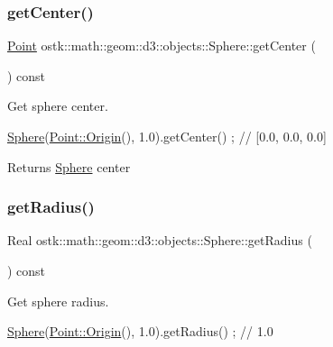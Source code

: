\subsubsection{\texorpdfstring{get\+Center()}{getCenter()}}
{\footnotesize\ttfamily \hyperlink{classostk_1_1math_1_1geom_1_1d3_1_1objects_1_1_point}{Point} ostk\+::math\+::geom\+::d3\+::objects\+::\+Sphere\+::get\+Center (\begin{DoxyParamCaption}{ }\end{DoxyParamCaption}) const}



Get sphere center. 


\begin{DoxyCode}
\hyperlink{classostk_1_1math_1_1geom_1_1d3_1_1objects_1_1_sphere_a6920f72260a7b2c9ffc29283540e16c2}{Sphere}(\hyperlink{classostk_1_1math_1_1geom_1_1d3_1_1objects_1_1_point_a079c199f08b015d456d02728a71b534c}{Point::Origin}(), 1.0).getCenter() ; \textcolor{comment}{// [0.0, 0.0, 0.0]}
\end{DoxyCode}


\begin{DoxyReturn}{Returns}
\hyperlink{classostk_1_1math_1_1geom_1_1d3_1_1objects_1_1_sphere}{Sphere} center 
\end{DoxyReturn}
\mbox{\label{classostk_1_1math_1_1geom_1_1d3_1_1objects_1_1_sphere_a856d4bceb6c0e3133aced9eab57d6450}} 
\subsubsection{\texorpdfstring{get\+Radius()}{getRadius()}}
{\footnotesize\ttfamily Real ostk\+::math\+::geom\+::d3\+::objects\+::\+Sphere\+::get\+Radius (\begin{DoxyParamCaption}{ }\end{DoxyParamCaption}) const}



Get sphere radius. 


\begin{DoxyCode}
\hyperlink{classostk_1_1math_1_1geom_1_1d3_1_1objects_1_1_sphere_a6920f72260a7b2c9ffc29283540e16c2}{Sphere}(\hyperlink{classostk_1_1math_1_1geom_1_1d3_1_1objects_1_1_point_a079c199f08b015d456d02728a71b534c}{Point::Origin}(), 1.0).getRadius() ; \textcolor{comment}{// 1.0}
\end{DoxyCode}


